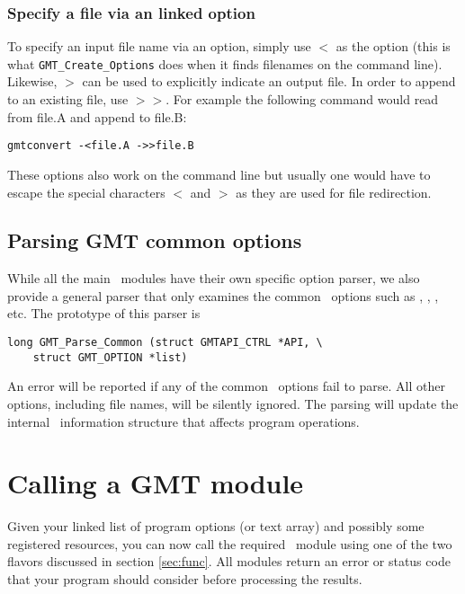 \documentclass{report}
\begin{document}
\subsubsection{Specify a file via an linked option}

To specify an input file name via an option, simply use $<$ as the option (this is what
\texttt{GMT\_Create\_Options} does when it finds filenames on the command line).
Likewise, $>$ can be used to explicitly indicate an output file.  In order to append to
an existing file, use $>>$.  For example the following command would read from file.A
and append to file.B:

\begin{verbatim}
gmtconvert -<file.A ->>file.B
\end{verbatim}

These options also work on the command line but usually one would have to escape the
special characters $<$ and $>$ as they are used for file redirection.

\subsection{Parsing GMT common options}

While all the main \GMT\ modules have their own specific option parser, we also provide a general
parser that only examines the common \GMT\ options such as , , , etc.  The prototype
of this parser is


\begin{verbatim}
long GMT_Parse_Common (struct GMTAPI_CTRL *API, \
    struct GMT_OPTION *list)
\end{verbatim}

An error will be reported if any of the common \GMT\ options fail to parse.  All other options,
including file names, will be silently ignored.  The parsing will update the internal \GMT\
information structure that affects program operations.

\section{Calling a GMT module}

Given your linked list of program options (or text array) and possibly some registered resources, you
can now call the required \GMT\ module using one of the two flavors discussed in section {\ref{sec:func}}.
All modules return an error or status code that your program should consider before processing the results.
\end{document}
